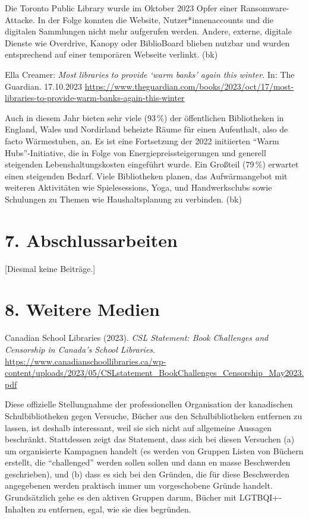 \documentclass[a4paper,
fontsize=11pt,
oneside,
numbers=noperiodatend,
parskip=half-,
bibliography=totoc,
final
]{scrartcl}
\begin{document}
Die Toronto Public Library wurde im Oktober 2023 Opfer einer
Ransomware-Attacke. In der Folge konnten die Website,
Nutzer*innenaccounts und die digitalen Sammlungen nicht mehr aufgerufen
werden. Andere, externe, digitale Dienste wie Overdrive, Kanopy oder
BiblioBoard blieben nutzbar und wurden entsprechend auf einer temporären
Webseite verlinkt. (bk)

Ella Creamer: \emph{Most libraries to provide \enquote*{warm banks}
again this winter.} In: The Guardian. 17.10.2023
\url{https://www.theguardian.com/books/2023/oct/17/most-libraries-to-provide-warm-banks-again-this-winter}

Auch in diesem Jahr bieten sehr viele (93\,\%) der öffentlichen
Bibliotheken in England, Wales und Nordirland beheizte Räume für einen
Aufenthalt, also de facto Wärmestuben, an. Es ist eine Fortsetzung der
2022 initiierten \enquote{Warm Hubs}-Initiative, die in Folge von
Energiepreissteigerungen und generell steigenden Lebenshaltungskosten
eingeführt wurde. Ein Großteil (79\,\%) erwartet einen steigenden
Bedarf. Viele Bibliotheken planen, das Aufwärmangebot mit weiteren
Aktivitäten wie Spielesessions, Yoga, und Handwerksclubs sowie
Schulungen zu Themen wie Haushaltsplanung zu verbinden. (bk)

\hypertarget{abschlussarbeiten}{%
\section{7. Abschlussarbeiten}\label{abschlussarbeiten}}

{[}Diesmal keine Beiträge.{]}

\hypertarget{weitere-medien}{%
\section{8. Weitere Medien}\label{weitere-medien}}

Canadian School Libraries (2023). \emph{CSL Statement: Book Challenges
and Censorship in Canada's School Libraries}.
\url{https://www.canadianschoollibraries.ca/wp-content/uploads/2023/05/CSLstatement_BookChallenges_Censorship_May2023.pdf}

Diese offizielle Stellungnahme der professionellen Organisation der
kanadischen Schulbibliotheken gegen Versuche, Bücher aus den
Schulbibliotheken entfernen zu lassen, ist deshalb interessant, weil sie
sich nicht auf allgemeine Aussagen beschränkt. Stattdessen zeigt das
Statement, dass sich bei diesen Versuchen (a) um organisierte Kampagnen
handelt (es werden von Gruppen Listen von Büchern erstellt, die
\enquote{challenged} werden sollen sollen und dann en masse Beschwerden
geschrieben), und (b) dass es sich bei den Gründen, die für diese
Beschwerden angegebenen werden praktisch immer um vorgeschobene Gründe
handelt. Grundsätzlich gehe es den aktiven Gruppen darum, Bücher mit
LGTBQI+-Inhalten zu entfernen, egal, wie sie dies begründen.
\end{document}
